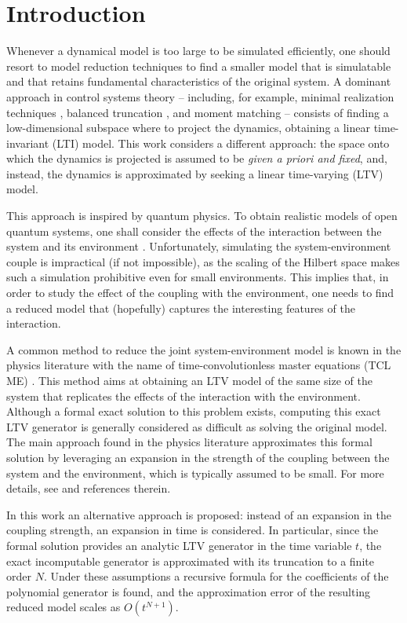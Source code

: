 \documentclass[twocolumn]{autart}    %
\begin{document}
\section{Introduction}
Whenever a dynamical model is too large to be simulated efficiently, one should resort to model reduction techniques to find a smaller model that is simulatable and that retains fundamental characteristics of the original system. A dominant approach in control systems theory -- including, for example, minimal realization techniques \cite{rosenbrock1970state}, balanced truncation \cite{antoulas,gugercin2004survey}, and moment matching \cite{astolfi_moment_matching,padoanmomentmatching} -- consists of finding a low-dimensional subspace where to project the dynamics, obtaining a linear time-invariant (LTI) model. This work considers a different approach: the space onto which the dynamics is projected is assumed to be {\em given a priori and fixed}, and, instead, the dynamics is approximated by seeking a linear time-varying (LTV) model. 

This approach is inspired by quantum physics. 
To obtain realistic models of open quantum systems, one shall consider the effects of the interaction between the system and its environment \cite{breuer2002theory}. Unfortunately, simulating the system-environment couple is impractical (if not impossible), as the scaling of the Hilbert space makes such a simulation prohibitive even for small environments. This implies that, in order to study the effect of the coupling with the environment, one needs to find a reduced model that (hopefully) captures the interesting features of the interaction.

A common method to reduce the joint system-environment model is known in the physics literature with the name of time-convolutionless master equations (TCL ME) \cite{shibata_generalized_1977,chaturvedi_time-convolutionless_1979}. This method aims at obtaining an LTV model of the same size of the system that replicates the effects of the interaction with the environment. Although a formal exact solution to this problem exists, computing this exact LTV generator is generally considered as difficult as solving the original model. The main approach found in the physics literature approximates this formal solution by leveraging an expansion in the strength of the coupling between the system and the environment, which is typically assumed to be small. For more details, see  \cite{breuer2002theory} and references therein. 

In this work an alternative approach is proposed: instead of an expansion in the coupling strength, an expansion in time is considered. In particular, since the formal solution provides an analytic LTV generator in the time variable $t$, the exact incomputable generator is approximated with its truncation to a finite order $N$.  Under these assumptions a recursive formula for the coefficients of the polynomial generator is found, and the approximation error of the resulting reduced model scales as $O(t^{N+1})$. 
\end{document}
